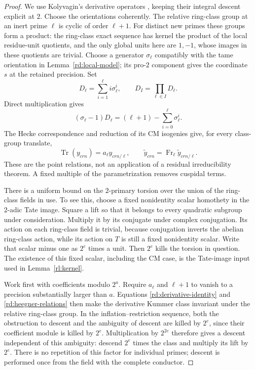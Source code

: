 \begin{proof}
We use Kolyvagin's derivative operators \cite{Kolyvagin1990}, keeping
their integral descent explicit at $2$.  Choose the orientations
coherently.  The relative ring-class group at
an inert prime \(\ell\) is cyclic of order \(\ell+1\).  For distinct new
primes these groups form a product: the ring-class exact sequence has
kernel the product of the local residue-unit quotients, and the only
global units here are \(1,-1\), whose images in these quotients are
trivial.  Choose a generator \(\sigma_\ell\) compatibly with the
tame orientation in Lemma~\ref{rd:local-model}; its pro-\(2\)
component gives the coordinate \(s\) at the retained precision.
Set
\[
 D_\ell=\sum_{i=1}^{\ell} i\sigma_\ell^i,\qquad
 D_I=\prod_{\ell\in I}D_\ell.
\]
Direct multiplication gives
\begin{equation}
 (\sigma_\ell-1)D_\ell=(\ell+1)-
             \sum_{i=0}^{\ell}\sigma_\ell^i.
 \label{rd:derivative-identity}
\end{equation}
The Hecke correspondence and reduction of its CM isogenies give, for
every class-group translate,
\begin{equation}
 \operatorname{Tr}(y_{c r n})=a_\ell y_{c r n/\ell},
 \qquad
 \widetilde y_{c r n}=\operatorname{Fr}_\ell
                       \widetilde y_{c r n/\ell}.
 \label{rd:heegner-relations}
\end{equation}
These are the point relations, not an application of a residual
irreducibility theorem.  A fixed multiple of the parametrization removes
cuspidal terms.

There is a uniform bound on the \(2\)-primary torsion over the union of
the ring-class fields in use.  To see this, choose a fixed nonidentity
scalar homothety in the \(2\)-adic Tate image.  Square a lift so that it
belongs to every quadratic subgroup under consideration.  Multiply it
by its conjugate under complex conjugation.  Its action on each
ring-class field is trivial, because conjugation inverts the abelian
ring-class action, while its action on \(T\) is still a fixed
nonidentity scalar.  Write that scalar minus one as \(2^e\) times
a unit.  Then \(2^e\) kills the torsion in question.  The existence of
this fixed scalar, including the CM case, is the Tate-image input
used in Lemma~\ref{rl:kernel}.

Work first with coefficients modulo \(2^a\).  Require \(a_\ell\) and
\(\ell+1\) to vanish to a precision substantially larger than \(a\).
Equations \eqref{rd:derivative-identity} and
\eqref{rd:heegner-relations} then make the derivative Kummer class
invariant under the relative ring-class group.  In the
inflation--restriction sequence, both the obstruction to descent and
the ambiguity of descent are killed by \(2^e\), since their
coefficient module is killed by \(2^e\).  Multiplication by \(2^{2e}\)
therefore gives a descent independent of this ambiguity: descend
\(2^e\) times the class and multiply its lift by \(2^e\).
There is no repetition of this factor for individual primes; descent
is performed once from the field with the complete conductor.


\end{proof}
